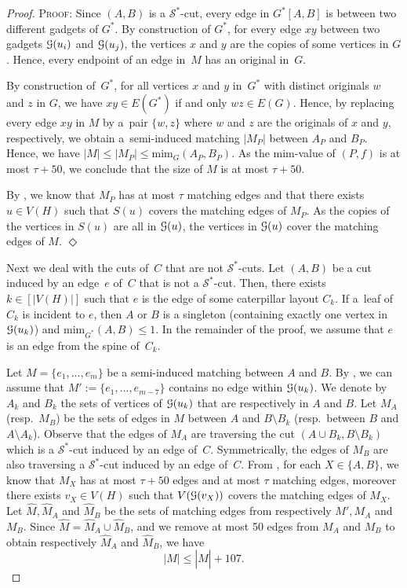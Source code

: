 \documentclass[a4paper,UKenglish,cleveref,hyperref,autoref]{lipics-v2021}
\renewcommand{\leq}{\leqslant}
\newenvironment{proofofclaim}{\noindent \textsc{Proof:}}{\hfill$\Diamond$\medskip}
\newcommand{\mim}{\text{mim}}
\begin{document}
\begin{proof}
\begin{proofofclaim}
		Since $(A,B)$ is a $\mathcal S^*$-cut, every edge in $G^*[A,B]$ is between two different gadgets of $G^*$.
		By construction of $G^*$, for every edge $xy$ between two gadgets $\mathcal G(u_i)$ and $\mathcal G(u_j)$, the vertices $x$ and $y$ are the copies of some vertices in $G$. 
		Hence, every endpoint of an edge in~$M$ has an original in~$G$.
		
		By construction of~$G^*$, for all vertices $x$ and $y$ in~$G^*$ with distinct originals $w$ and $z$ in $G$, we have $xy\in E(G^*)$ if and only $wz\in E(G)$.
		Hence, by replacing every edge $xy$ in $M$ by a~pair $\{w,z\}$ where $w$ and $z$ are the originals of $x$ and $y$, respectively, we obtain a~semi-induced matching $|M_P|$ between $A_P$ and $B_P$.
		Hence, we have $ |M| \leq |M_P| \leq \mim_{G}(A_P,B_P)$.	
		As the mim-value of $(P,f)$	is at most $\tau + 50$, we conclude that the size of $M$ is at most $\tau + 50$.
		
		By , we know that $M_P$ has at most $\tau$ matching edges and that there exists $u\in V(H)$ such that $S(u)$ covers the matching edges of $M_P$.
		As the copies of the vertices in $S(u)$ are all in $\mathcal G(u)$, the vertices in $\mathcal G(u)$ cover the matching edges of $M$.
	\end{proofofclaim}
	
	Next we deal with the cuts of~$C$ that are not $\mathcal S^*$-cuts.
	Let $(A,B)$ be a cut induced by an edge~$e$ of~$C$ that is not a $\mathcal S^*$-cut.
	Then, there exists $k\in [|V(H)|]$ such that $e$ is the edge of some caterpillar layout $C_k$.
	If a~leaf of~$C_k$ is incident to $e$, then $A$ or $B$ is a singleton (containing exactly one vertex in $\mathcal G(u_k)$) and $\mim_{G^*}(A,B)\leq 1$.
	In the remainder of the proof, we assume that $e$ is an edge from the spine of~$C_k$.
	
	Let $M=\{e_1,\dots,e_m\}$ be a semi-induced matching between $A$ and $B$.
	By , we can assume that $M':=\{e_1,\dots,e_{m-7}\}$ contains no edge within $\mathcal G(u_k)$.
	We denote by $A_k$ and $B_k$ the sets of vertices of $\mathcal G(u_k)$ that are respectively in $A$ and $B$.
	Let $M_A$ (resp.~$M_B$) be the sets of edges in $M$ between $A$ and $B \setminus B_k$ (resp.~between $B$ and $A \setminus A_k$).
	Observe that the edges of $M_A$ are traversing the cut $(A\cup B_k, B\setminus B_k)$ which is a $\mathcal S^*$-cut induced by an edge of~$C$.
	Symmetrically, the edges of $M_B$ are also traversing a $\mathcal S^*$-cut induced by an edge of~$C$.
	From , for each $X\in \{A,B\}$, we know that $M_X$ has at most $\tau + 50$ edges and at most $\tau$ matching edges, moreover there exists $v_X\in V(H)$ such that $V(\mathcal G(v_X))$ covers the matching edges of $M_X$.
	Let $\widehat M,\widehat M_A$ and $\widehat M_B$ be the sets of matching edges from respectively $M',M_A$ and $M_B$.
	Since $\widehat M = \widehat M_A \cup \widehat M_B$, and we remove at most 50 edges from $M_A$ and $M_B$ to obtain respectively $\widehat M_A$ and $\widehat M_B$, we have 
	\begin{equation}\label{eq:M:hat:M}
		|M| \leq |\widehat M| + 107.
	\end{equation}
	

\end{proof}
\end{document}
